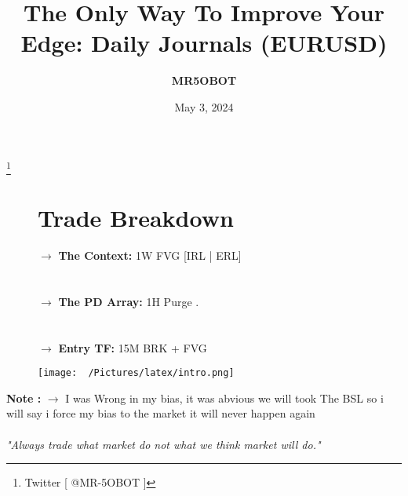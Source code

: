 \documentclass{article}
\title{The Only Way To Improve Your Edge: Daily Journals (EURUSD)}
\author{\textbf{MR5OBOT}}
\date{May 3, 2024}
\begin{document}
\maketitle


\renewcommand{\thefootnote}{}
\footnote{Twitter [ @MR-5OBOT ]}

\renewcommand{\arraystretch}{1.5} %
\setlength{\tabcolsep}{10pt} %



\begin{figure}[h!]
\begin{minipage}{0.7\textwidth}
\section*{Trade Breakdown}
\vspace{0.3cm}

$\rightarrow$ \textbf{The Context:}  1W FVG [IRL | ERL]  \\\\\\
$\rightarrow$ \textbf{The PD Array:} 1H Purge .  \\\\\\
$\rightarrow$ \textbf{Entry TF:} 15M BRK + FVG
\vspace{0.8cm}
\end{minipage}
\hfill
\begin{minipage}{0.35\textwidth}
  \texttt{[image: ~/Pictures/latex/intro.png]}
  \label{fig:image}
\end{minipage}
\end{figure}

\vspace{1cm}

\begin{center}
\begin{mdframed}[style=MyQuoteFrame]
  \textbf{Note :} $\rightarrow$ I was Wrong in my bias, it was abvious we will took The BSL so i will say i force my bias to the market it will never happen again \\\\
\noindent  \textit{"Always trade what market do not what we think market will do."}
\end{mdframed}
\end{center}
\end{document}
